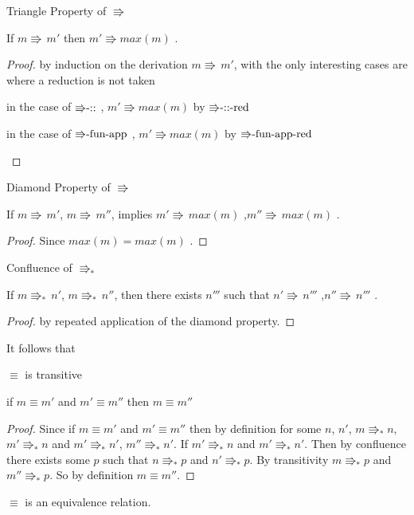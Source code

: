 \begin{lem}
Triangle Property of $\Rrightarrow$

If $m\Rrightarrow\,m'$ then $m'\Rrightarrow max\left(m\right)$ .
\end{lem}

\begin{proof}
by induction on the derivation $m\Rrightarrow\,m'$, with the only
interesting cases are where a reduction is not taken
\begin{casenv}
\item in the case of $\textrm{\ensuremath{\Rrightarrow}-::}$ , $m'\Rrightarrow max\left(m\right)$
by $\textrm{\ensuremath{\Rrightarrow}-::-red}$
\item in the case of $\textrm{\ensuremath{\Rrightarrow}-fun-app}$ , $m'\Rrightarrow max\left(m\right)$
by $\textrm{\ensuremath{\Rrightarrow}-fun-app-red}$ 
\end{casenv}
\end{proof}
\begin{lem}
Diamond Property of $\Rrightarrow$

If $m\Rrightarrow\,m'$, $m\Rrightarrow\,m''$, implies $m'\Rrightarrow\,max\left(m\right)$
,$m''\Rrightarrow\,max\left(m\right)$ . 
\end{lem}

\begin{proof}
Since $max\left(m\right)=max\left(m\right)$ . 
\end{proof}
\begin{thm}
Confluence of $\Rrightarrow_{\ast}$ 

If $m\Rrightarrow_{\ast}\,n'$, $m\Rrightarrow_{\ast}\,n''$, then
there exists $n'''$ such that $n'\Rrightarrow\,n'''$ ,$n''\Rrightarrow\,n'''$
.
\end{thm}

\begin{proof}
by repeated application of the diamond property.
\end{proof}
It follows that
\begin{thm}
$\equiv$ is transitive

if $m\equiv m'$ and $m'\equiv m''$ then $m\equiv m''$
\end{thm}

\begin{proof}
Since if $m\equiv m'$ and $m'\equiv m''$ then by definition for some $n$, $n'$, $m\Rrightarrow_{\ast}n$, $m'\Rrightarrow_{\ast}n$ and $m'\Rrightarrow_{\ast}n'$, $m''\Rrightarrow_{\ast}n'$. If $m'\Rrightarrow_{\ast}n$ and $m'\Rrightarrow_{\ast}n'$.
Then by confluence there exists some $p$ such that $n\Rrightarrow_{\ast}p$ and $n'\Rrightarrow_{\ast}p$.
By transitivity $m\Rrightarrow_{\ast}p$ and $m''\Rrightarrow_{\ast}p$.
So by definition $m\equiv m''$.
\end{proof}
\begin{fact}
$\equiv$ is an equivalence relation.
\end{fact}


